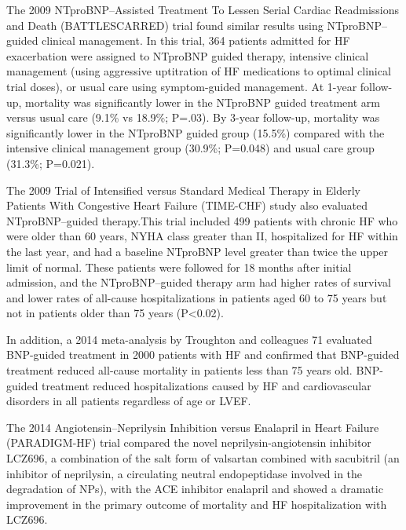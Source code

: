 \documentclass[14pt,a4paper,onecolumn]{extarticle}
\begin{document}
The 2009 NTproBNP–Assisted Treatment To Lessen Serial Cardiac Readmissions and Death (BATTLESCARRED) trial found similar results using NTproBNP–guided clinical management. In this trial, 364 patients admitted for HF exacerbation were assigned to NTproBNP guided therapy, intensive clinical management (using aggressive uptitration of HF medications to optimal clinical trial doses), or usual care using symptom-guided management. At 1-year follow-up, mortality was significantly lower in the NTproBNP guided treatment arm versus usual care (9.1\% vs 18.9\%; P=.03). By 3-year follow-up, mortality was significantly lower in the NTproBNP guided group (15.5\%) compared with the intensive clinical management group (30.9\%; P=0.048) and usual care group (31.3\%; P=0.021). \citep{Lainchbury2009} %

The 2009 Trial of Intensified versus Standard Medical Therapy in Elderly Patients With Congestive Heart Failure (TIME-CHF) study also evaluated NTproBNP–guided therapy.This trial included 499 patients with chronic HF who were older than 60 years, NYHA class greater than II, hospitalized for HF within the last year, and had a baseline NTproBNP level greater than twice the upper limit of normal. These patients were followed for 18 months after initial admission, and the NTproBNP–guided therapy arm had higher rates of survival and lower rates of all-cause hospitalizations in patients aged 60 to 75 years but not in patients older than 75 years (P<0.02). \citep{Pfisterer2009} %

In addition, a 2014 meta-analysis by Troughton and colleagues 71 evaluated BNP-guided treatment in 2000 patients with HF and confirmed that BNP-guided treatment reduced all-cause mortality in patients less than 75 years old. BNP-guided treatment reduced hospitalizations caused by HF and cardiovascular disorders in all patients regardless of age or LVEF. \citep{Troughton2014} %

The 2014 Angiotensin–Neprilysin Inhibition versus Enalapril in Heart Failure (PARADIGM-HF) trial compared the novel neprilysin-angiotensin inhibitor LCZ696, a combination of the salt form of valsartan combined with sacubitril (an inhibitor of neprilysin, a circulating neutral endopeptidase involved in the degradation of NPs), with the ACE inhibitor enalapril and showed a dramatic improvement in the primary outcome of mortality and HF hospitalization with LCZ696. \citep{McMurray2014} %
\end{document}
